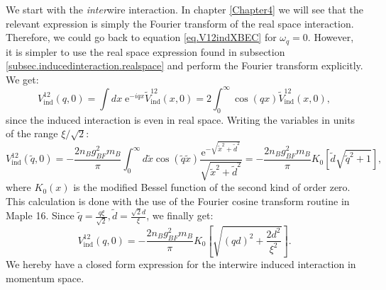 We start with the \textit{inter}wire interaction. In chapter \ref{Chapter4} we will see that the relevant expression is simply the Fourier transform of the real space interaction. Therefore, we could go back to equation \eqref{eq.V12indXBEC} for $\omega_q = 0$. However, it is simpler to use the real space expression found in subsection \ref{subsec.inducedinteraction.realspace} and perform the Fourier transform explicitly. We get:
\begin{equation}
V_{\text{ind}}^{12}(q,0) = \int dx \; \text{e}^{-iqx}\tilde{V}_{\text{ind}}^{12}(x,0) = 2\int_0^\infty \cos(qx)\tilde{V}_{\text{ind}}^{12}(x,0), \nonumber
\end{equation}
since the induced interaction is even in real space. Writing the variables in units of the range $\xi/\sqrt{2}$:
\begin{equation}
V_{\text{ind}}^{12}(\tilde{q},0) = -\frac{2n_Bg^2_{BF}m_B}{\pi}\int_0^\infty d\tilde{x} \cos(\tilde{q}\tilde{x})\frac{ \text{e}^{ -\sqrt{\tilde{x}^2+\tilde{d}^2} } }{\sqrt{\tilde{x}^2+\tilde{d}^2}} = -\frac{2n_Bg^2_{BF}m_B}{\pi}K_0\left[\tilde{d}\sqrt{\tilde{q}^2+1}\right], \nonumber
\end{equation}
where $K_0(x)$ is the modified Bessel function of the second kind of order zero. This calculation is done with the use of the Fourier cosine transform routine in Maple 16. Since $\tilde{q} = \frac{q\xi}{\sqrt{2}}, \tilde{d} = \frac{\sqrt{2}d}{\xi}$, we finally get:
 \begin{equation}
V_{\text{ind}}^{12}(q,0) = -\frac{2n_Bg^2_{BF}m_B}{\pi}K_0\left[\sqrt{(qd)^2+\frac{2d^2}{\xi^2}}\right]. 
\label{eq.V12indq.zerofrequency}
\end{equation}
We hereby have a closed form expression for the interwire induced interaction in momentum space. 

